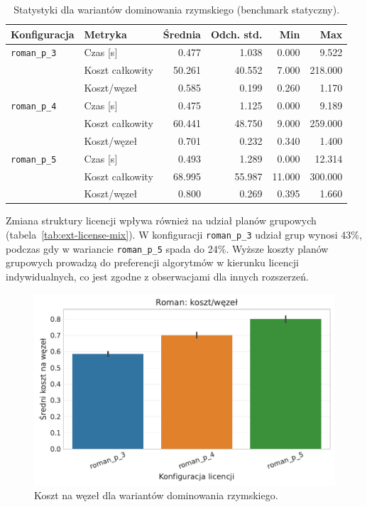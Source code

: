 \begin{table}[H]
  \centering
  \caption{Statystyki dla wariantów dominowania rzymskiego (benchmark statyczny).}
  \label{tab:ext-roman-stats}
  \begin{tabular}{llrrrr}
    \toprule
    \textbf{Konfiguracja} & \textbf{Metryka} & \textbf{Średnia} & \textbf{Odch. std.} & \textbf{Min} & \textbf{Max} \\
    \midrule
    \texttt{roman\_p\_3}  & Czas [s]         & 0.477            & 1.038               & 0.000        & 9.522        \\
                          & Koszt całkowity  & 50.261           & 40.552              & 7.000        & 218.000      \\
                          & Koszt/węzeł      & 0.585            & 0.199               & 0.260        & 1.170        \\
    \midrule
    \texttt{roman\_p\_4}  & Czas [s]         & 0.475            & 1.125               & 0.000        & 9.189        \\
                          & Koszt całkowity  & 60.441           & 48.750              & 9.000        & 259.000      \\
                          & Koszt/węzeł      & 0.701            & 0.232               & 0.340        & 1.400        \\
    \midrule
    \texttt{roman\_p\_5}  & Czas [s]         & 0.493            & 1.289               & 0.000        & 12.314       \\
                          & Koszt całkowity  & 68.995           & 55.987              & 11.000       & 300.000      \\
                          & Koszt/węzeł      & 0.800            & 0.269               & 0.395        & 1.660        \\
    \bottomrule
  \end{tabular}
\end{table}

Zmiana struktury licencji wpływa również na udział planów grupowych (tabela~\ref{tab:ext-license-mix}). W konfiguracji \texttt{roman\_p\_3} udział grup wynosi 43\%, podczas gdy w wariancie \texttt{roman\_p\_5} spada do 24\%. Wyższe koszty planów grupowych prowadzą do preferencji algorytmów w kierunku licencji indywidualnych, co jest zgodne z obserwacjami dla innych rozszerzeń.

\begin{figure}[H]
  \centering
  \includegraphics[width=0.6\linewidth]{assets/figures/extensions/static/roman_cost_per_node_comparison.pdf}
  \caption{Koszt na węzeł dla wariantów dominowania rzymskiego.}
  \label{fig:ext-roman-cost}
\end{figure}

